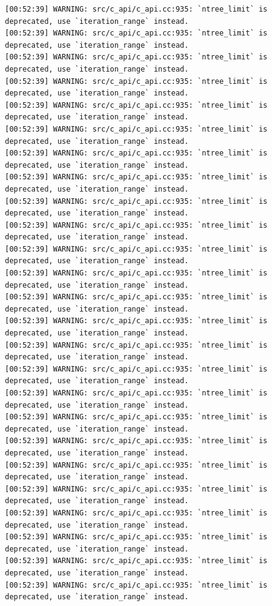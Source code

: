 \documentclass[
  letterpaper,
  DIV=11,
  numbers=noendperiod]{scrartcl}
\begin{document}
\begin{verbatim}
[00:52:39] WARNING: src/c_api/c_api.cc:935: `ntree_limit` is deprecated, use `iteration_range` instead.
[00:52:39] WARNING: src/c_api/c_api.cc:935: `ntree_limit` is deprecated, use `iteration_range` instead.
[00:52:39] WARNING: src/c_api/c_api.cc:935: `ntree_limit` is deprecated, use `iteration_range` instead.
[00:52:39] WARNING: src/c_api/c_api.cc:935: `ntree_limit` is deprecated, use `iteration_range` instead.
[00:52:39] WARNING: src/c_api/c_api.cc:935: `ntree_limit` is deprecated, use `iteration_range` instead.
[00:52:39] WARNING: src/c_api/c_api.cc:935: `ntree_limit` is deprecated, use `iteration_range` instead.
[00:52:39] WARNING: src/c_api/c_api.cc:935: `ntree_limit` is deprecated, use `iteration_range` instead.
[00:52:39] WARNING: src/c_api/c_api.cc:935: `ntree_limit` is deprecated, use `iteration_range` instead.
[00:52:39] WARNING: src/c_api/c_api.cc:935: `ntree_limit` is deprecated, use `iteration_range` instead.
[00:52:39] WARNING: src/c_api/c_api.cc:935: `ntree_limit` is deprecated, use `iteration_range` instead.
[00:52:39] WARNING: src/c_api/c_api.cc:935: `ntree_limit` is deprecated, use `iteration_range` instead.
[00:52:39] WARNING: src/c_api/c_api.cc:935: `ntree_limit` is deprecated, use `iteration_range` instead.
[00:52:39] WARNING: src/c_api/c_api.cc:935: `ntree_limit` is deprecated, use `iteration_range` instead.
[00:52:39] WARNING: src/c_api/c_api.cc:935: `ntree_limit` is deprecated, use `iteration_range` instead.
[00:52:39] WARNING: src/c_api/c_api.cc:935: `ntree_limit` is deprecated, use `iteration_range` instead.
[00:52:39] WARNING: src/c_api/c_api.cc:935: `ntree_limit` is deprecated, use `iteration_range` instead.
[00:52:39] WARNING: src/c_api/c_api.cc:935: `ntree_limit` is deprecated, use `iteration_range` instead.
[00:52:39] WARNING: src/c_api/c_api.cc:935: `ntree_limit` is deprecated, use `iteration_range` instead.
[00:52:39] WARNING: src/c_api/c_api.cc:935: `ntree_limit` is deprecated, use `iteration_range` instead.
[00:52:39] WARNING: src/c_api/c_api.cc:935: `ntree_limit` is deprecated, use `iteration_range` instead.
[00:52:39] WARNING: src/c_api/c_api.cc:935: `ntree_limit` is deprecated, use `iteration_range` instead.
[00:52:39] WARNING: src/c_api/c_api.cc:935: `ntree_limit` is deprecated, use `iteration_range` instead.
[00:52:39] WARNING: src/c_api/c_api.cc:935: `ntree_limit` is deprecated, use `iteration_range` instead.
[00:52:39] WARNING: src/c_api/c_api.cc:935: `ntree_limit` is deprecated, use `iteration_range` instead.
[00:52:39] WARNING: src/c_api/c_api.cc:935: `ntree_limit` is deprecated, use `iteration_range` instead.

\end{verbatim}
\end{document}
